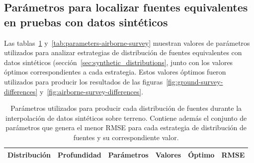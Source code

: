 
\begin{subappendices}

\section[%
    Parámetros para localizar fuentes equivalentes en pruebas con datos sintéticos
]{%
    Parámetros para localizar fuentes equivalentes en pruebas con datos sintéticos
}

\label{sec:sources}

Las tablas~\ref{tab:parameters-ground-survey}
y~\ref{tab:parameters-airborne-survey} muestran valores de parámetros
utilizados para analizar estrategias de distribución de fuentes equivalentes
con datos sintéticos (sección~\ref{sec:synthetic_distributions}, junto con los
valores óptimos correspondientes a cada estrategia.
Estos valores óptimos fueron utilizados para producir los resultados de las
figuras~\ref{fig:ground-survey-differences}
y~\ref{fig:airborne-survey-differences}.


\begin{table}[h]
    \centering
    \caption{
        Parámetros utilizados para producir cada distribución de fuentes
        durante la interpolación de datos sintéticos sobre terreno.
        Contiene además el conjunto de parámetros que genera el menor
        \acs{RMSE} para cada estrategia de distribución de fuentes y su
        correspondiente valor.
    }
    \label{tab:parameters-ground-survey}
    {\scriptsize %
    \begin{tabular}{c c l c c c}
        \textbf{Distribución}
            & \textbf{Profundidad}
            & \multicolumn{1}{c}{\textbf{Parámetros}}
            & \textbf{Valores}
            & \textbf{Óptimo}
            & \textbf{RMSE} \\
        \toprule


\end{tabular}}
\end{table}
\end{subappendices}
